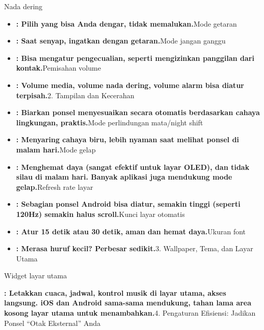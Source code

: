 


Nada dering

\begin{itemize}
  \item \textbf{: Pilih yang bisa Anda dengar, tidak memalukan.}Mode getaran
  \item \textbf{: Saat senyap, ingatkan dengan getaran.}Mode jangan ganggu
  \item \textbf{: Bisa mengatur pengecualian, seperti mengizinkan panggilan dari kontak.}Pemisahan volume
  \item \textbf{: Volume media, volume nada dering, volume alarm bisa diatur terpisah.}2. Tampilan dan Kecerahan
\end{itemize}


\begin{itemize}
  \item \textbf{: Biarkan ponsel menyesuaikan secara otomatis berdasarkan cahaya lingkungan, praktis.}Mode perlindungan mata/night shift
  \item \textbf{: Menyaring cahaya biru, lebih nyaman saat melihat ponsel di malam hari.}Mode gelap
  \item \textbf{: Menghemat daya (sangat efektif untuk layar OLED), dan tidak silau di malam hari. Banyak aplikasi juga mendukung mode gelap.}Refresh rate layar
  \item \textbf{: Sebagian ponsel Android bisa diatur, semakin tinggi (seperti 120Hz) semakin halus scroll.}Kunci layar otomatis
  \item \textbf{: Atur 15 detik atau 30 detik, aman dan hemat daya.}Ukuran font
  \item \textbf{: Merasa huruf kecil? Perbesar sedikit.}3. Wallpaper, Tema, dan Layar Utama
\end{itemize}


Widget layar utama

\textbf{: Letakkan cuaca, jadwal, kontrol musik di layar utama, akses langsung. iOS dan Android sama-sama mendukung, tahan lama area kosong layar utama untuk menambahkan.}4. Pengaturan Efisiensi: Jadikan Ponsel “Otak Eksternal” Anda

